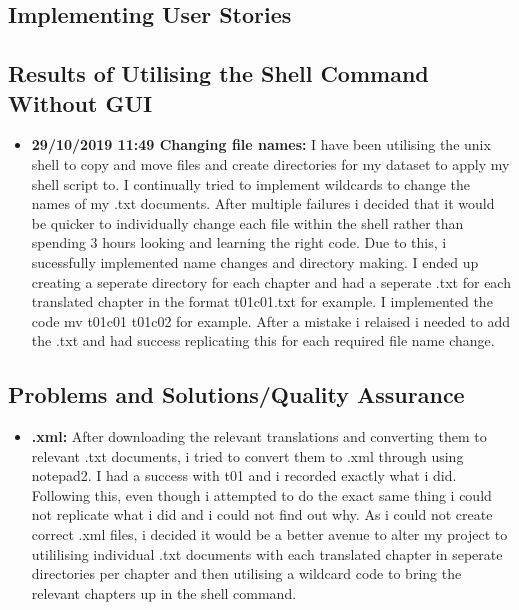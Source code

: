 \documentclass{article}
\begin{document}
\subsection{Implementing User Stories}


\subsection{Results of Utilising the Shell Command Without GUI}

\begin{itemize}
    \item{\textbf{ 29/10/2019 11:49 Changing file names:} I have been utilising the unix shell to copy and move files and create directories for my dataset to apply my shell script to. I continually tried to implement wildcards to change the names of my .txt documents. After multiple failures i decided that it would be quicker to individually change each file within the shell rather than spending 3 hours looking and learning the right code. Due to this, i sucessfully implemented name changes and directory making. I ended up creating a seperate directory for each chapter and had a seperate .txt for each translated chapter in the format t01c01.txt for example. I implemented the code mv t01c01 t01c02 for example. After a mistake i relaised i needed to add the .txt and had success replicating this for each required file name change.} 
\end{itemize}


\subsection{Problems and Solutions/Quality Assurance}

\begin{itemize}
    \item{\textbf{.xml:} After downloading the relevant translations and converting them to relevant .txt documents, i tried to convert them to .xml through using notepad2. I had a success with t01 and i recorded exactly what i did. Following this, even though i attempted to do the exact same thing i could not replicate what i did and i could not find out why. As i could not create correct .xml files, i decided it would be a better avenue to alter my project to utililising individual .txt documents with each translated chapter in seperate directories per chapter and then utilising a wildcard code to bring the relevant chapters up in the shell command.}
    
   
\end{itemize}
\end{document}
